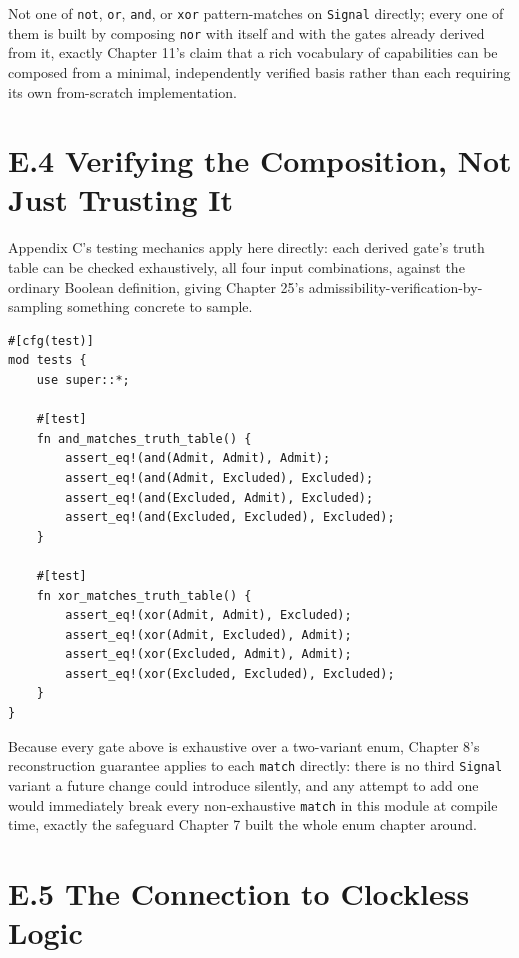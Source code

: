 \documentclass[11pt]{book}
\begin{document}
Not one of \texttt{not}, \texttt{or}, \texttt{and}, or \texttt{xor} pattern-matches on \texttt{Signal} directly; every one of them is built by composing \texttt{nor} with itself and with the gates already derived from it, exactly Chapter 11's claim that a rich vocabulary of capabilities can be composed from a minimal, independently verified basis rather than each requiring its own from-scratch implementation.

\section*{E.4 Verifying the Composition, Not Just Trusting It}

Appendix C's testing mechanics apply here directly: each derived gate's truth table can be checked exhaustively, all four input combinations, against the ordinary Boolean definition, giving Chapter 25's admissibility-verification-by-sampling something concrete to sample.

\begin{lstlisting}
#[cfg(test)]
mod tests {
    use super::*;

    #[test]
    fn and_matches_truth_table() {
        assert_eq!(and(Admit, Admit), Admit);
        assert_eq!(and(Admit, Excluded), Excluded);
        assert_eq!(and(Excluded, Admit), Excluded);
        assert_eq!(and(Excluded, Excluded), Excluded);
    }

    #[test]
    fn xor_matches_truth_table() {
        assert_eq!(xor(Admit, Admit), Excluded);
        assert_eq!(xor(Admit, Excluded), Admit);
        assert_eq!(xor(Excluded, Admit), Admit);
        assert_eq!(xor(Excluded, Excluded), Excluded);
    }
}
\end{lstlisting}

Because every gate above is exhaustive over a two-variant enum, Chapter 8's reconstruction guarantee applies to each \texttt{match} directly: there is no third \texttt{Signal} variant a future change could introduce silently, and any attempt to add one would immediately break every non-exhaustive \texttt{match} in this module at compile time, exactly the safeguard Chapter 7 built the whole enum chapter around.

\section*{E.5 The Connection to Clockless Logic}
\end{document}
